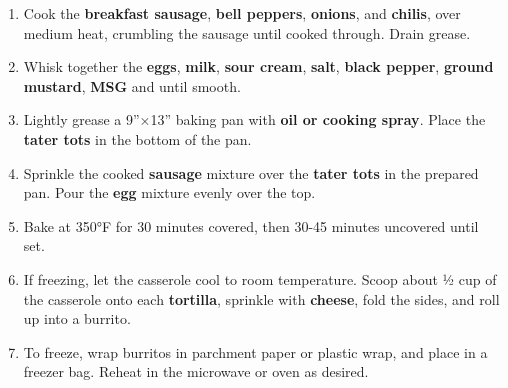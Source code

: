 \documentclass[11pt,letterpaper]{article}
\begin{document}
\begin{enumerate}
    \item Cook the \textbf{breakfast sausage}, \textbf{bell peppers}, \textbf{onions}, and \textbf{chilis}, over medium heat, crumbling the sausage until cooked through. Drain grease.
    \item Whisk together the \textbf{eggs}, \textbf{milk}, \textbf{sour cream}, \textbf{salt}, \textbf{black pepper}, \textbf{ground mustard}, \textbf{MSG} and  until smooth.
    \item Lightly grease a 9”×13” baking pan with \textbf{oil or cooking spray}. Place the \textbf{tater tots} in the bottom of the pan.
    \item Sprinkle the cooked \textbf{sausage} mixture over the \textbf{tater tots} in the prepared pan. Pour the \textbf{egg} mixture evenly over the top. 
    \item Bake at 350°F for 30 minutes covered, then 30-45 minutes uncovered until set.
    \item If freezing, let the casserole cool to room temperature. Scoop about ½ cup of the casserole onto each \textbf{tortilla}, sprinkle with \textbf{cheese}, fold the sides, and roll up into a burrito.
    \item To freeze, wrap burritos in parchment paper or plastic wrap, and place in a freezer bag. Reheat in the microwave or oven as desired.
\end{enumerate}
\end{document}
